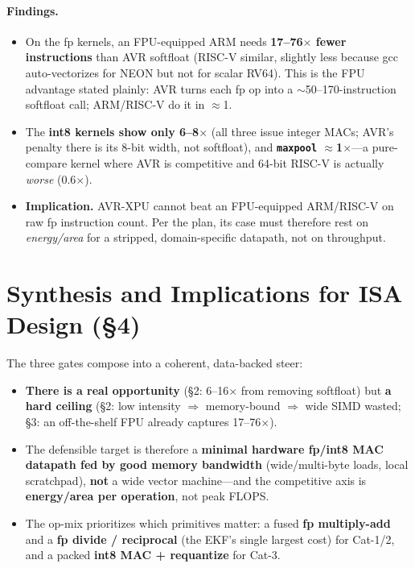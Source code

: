 \documentclass[11pt]{article}
\newcommand{\code}[1]{\texttt{#1}}
\begin{document}
\paragraph{Findings.}
\begin{itemize}
  \item On the fp kernels, an FPU-equipped ARM needs \textbf{17--76$\times$ fewer instructions} than AVR
  softfloat (RISC-V similar, slightly less because gcc auto-vectorizes for NEON but not for scalar RV64).
  This is the FPU advantage stated plainly: AVR turns each fp op into a $\sim$50--170-instruction softfloat
  call; ARM/RISC-V do it in $\approx$1.
  \item The \textbf{int8 kernels show only 6--8$\times$} (all three issue integer MACs; AVR's penalty there
  is its 8-bit width, not softfloat), and \textbf{\code{maxpool} $\approx$1$\times$}---a pure-compare
  kernel where AVR is competitive and 64-bit RISC-V is actually \emph{worse} (0.6$\times$).
  \item \textbf{Implication.} AVR-XPU cannot beat an FPU-equipped ARM/RISC-V on raw fp instruction count.
  Per the plan, its case must therefore rest on \emph{energy/area} for a stripped, domain-specific
  datapath, not on throughput.
\end{itemize}

\section{Synthesis and Implications for ISA Design (\S4)}
The three gates compose into a coherent, data-backed steer:
\begin{itemize}
  \item \textbf{There is a real opportunity} (\S2: 6--16$\times$ from removing softfloat) but
  \textbf{a hard ceiling} (\S2: low intensity $\Rightarrow$ memory-bound $\Rightarrow$ wide SIMD wasted;
  \S3: an off-the-shelf FPU already captures 17--76$\times$).
  \item The defensible target is therefore a \textbf{minimal hardware fp/int8 MAC datapath fed by good
  memory bandwidth} (wide/multi-byte loads, local scratchpad), \textbf{not} a wide vector machine---and
  the competitive axis is \textbf{energy/area per operation}, not peak FLOPS.
  \item The op-mix prioritizes which primitives matter: a fused \textbf{fp multiply-add} and a
  \textbf{fp divide / reciprocal} (the EKF's single largest cost) for Cat-1/2, and a packed
  \textbf{int8 MAC + requantize} for Cat-3.
\end{itemize}
\end{document}
